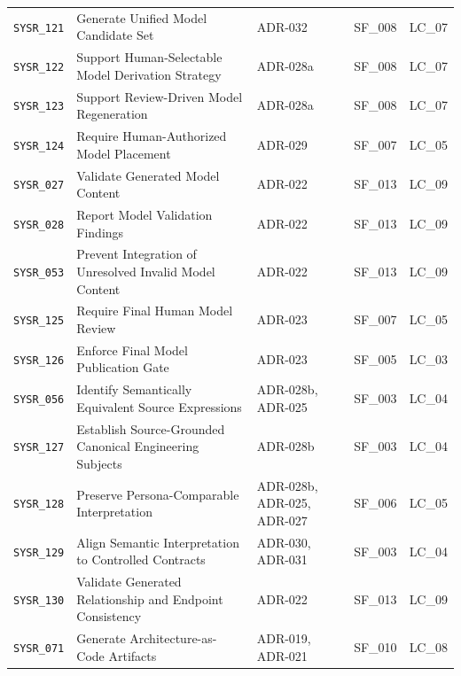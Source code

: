 \begin{xltabular}{\textwidth}{@{}p{1.65cm}X p{2.25cm}p{2.0cm}p{1.7cm}@{}}
\texttt{SYSR\_121} & Generate Unified Model Candidate Set & ADR-032 & SF\_008 & LC\_07\\

\texttt{SYSR\_122} & Support Human-Selectable Model Derivation Strategy & ADR-028a & SF\_008 & LC\_07\\

\texttt{SYSR\_123} & Support Review-Driven Model Regeneration & ADR-028a & SF\_008 & LC\_07\\

\texttt{SYSR\_124} & Require Human-Authorized Model Placement & ADR-029 & SF\_007 & LC\_05\\

\texttt{SYSR\_027} & Validate Generated Model Content & ADR-022 & SF\_013 & LC\_09\\

\texttt{SYSR\_028} & Report Model Validation Findings & ADR-022 & SF\_013 & LC\_09\\

\texttt{SYSR\_053} & Prevent Integration of Unresolved Invalid Model Content & ADR-022 & SF\_013 & LC\_09\\

\texttt{SYSR\_125} & Require Final Human Model Review & ADR-023 & SF\_007 & LC\_05\\

\texttt{SYSR\_126} & Enforce Final Model Publication Gate & ADR-023 & SF\_005 & LC\_03\\

\texttt{SYSR\_056} & Identify Semantically Equivalent Source Expressions & ADR-028b, ADR-025 & SF\_003 & LC\_04\\

\texttt{SYSR\_127} & Establish Source-Grounded Canonical Engineering Subjects & ADR-028b & SF\_003 & LC\_04\\

\texttt{SYSR\_128} & Preserve Persona-Comparable Interpretation & ADR-028b, ADR-025, ADR-027 & SF\_006 & LC\_05\\

\texttt{SYSR\_129} & Align Semantic Interpretation to Controlled Contracts & ADR-030, ADR-031 & SF\_003 & LC\_04\\

\texttt{SYSR\_130} & Validate Generated Relationship and Endpoint Consistency & ADR-022 & SF\_013 & LC\_09\\

\texttt{SYSR\_071} & Generate Architecture-as-Code Artifacts & ADR-019, ADR-021 & SF\_010 & LC\_08\\


\end{xltabular}
